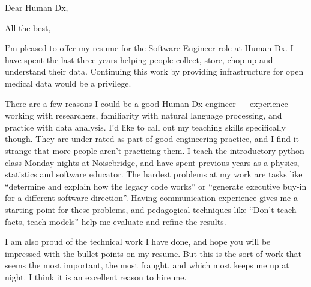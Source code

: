 \documentclass[11pt,a4paper,sans]{moderncv}        %
\begin{document}
\recipient{~}{~}
\date{\today}
\opening{Dear Human Dx,}
\closing{All the best,}
\makelettertitle%
I'm pleased to offer my resume for the Software Engineer role at Human Dx.
I have spent the last three years helping people collect, store, chop up and understand their data.
Continuing this work by providing infrastructure for open medical data would be a privilege.


There are a few reasons I could be a good Human Dx engineer --- experience working with researchers, familiarity with natural language processing, and practice with data analysis.
I'd like to call out my teaching skills specifically though.
They are under rated as part of good engineering practice, and I find it strange that more people aren't practicing them.
I teach the introductory python class Monday nights at Noisebridge, and have spent previous years as a physics, statistics and software educator.
The hardest problems at my work are tasks like ``determine and explain how the legacy code works'' or ``generate executive buy-in for a different software direction''.
Having communication experience gives me a starting point for these problems, and pedagogical techniques like ``Don't teach facts, teach models'' help me evaluate and refine the results.


I am also proud of the technical work I have done, and hope you will be impressed with the bullet points on my resume.
But this is the sort of work that seems the most important, the most fraught, and which most keeps me up at night.
I think it is an excellent reason to hire me.


\makeletterclosing%
\end{document}
